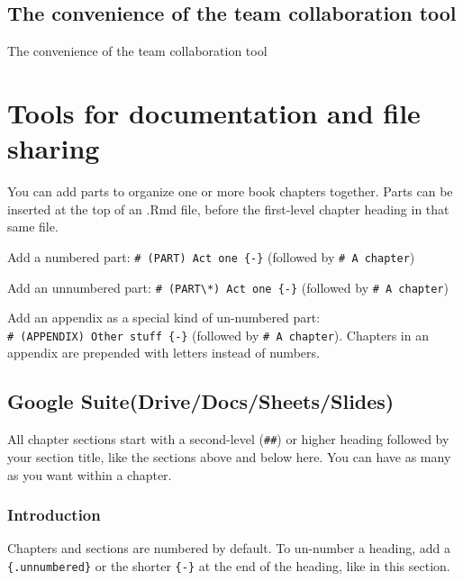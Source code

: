 \documentclass[
]{book}
\begin{document}
\hypertarget{the-convenience-of-the-team-collaboration-tool}{%
\section{The convenience of the team collaboration tool}\label{the-convenience-of-the-team-collaboration-tool}}

The convenience of the team collaboration tool

\hypertarget{tools-for-documentation-and-file-sharing}{%
\chapter{Tools for documentation and file sharing}\label{tools-for-documentation-and-file-sharing}}

You can add parts to organize one or more book chapters together. Parts can be inserted at the top of an .Rmd file, before the first-level chapter heading in that same file.

Add a numbered part: \texttt{\#\ (PART)\ Act\ one\ \{-\}} (followed by \texttt{\#\ A\ chapter})

Add an unnumbered part: \texttt{\#\ (PART\textbackslash{}*)\ Act\ one\ \{-\}} (followed by \texttt{\#\ A\ chapter})

Add an appendix as a special kind of un-numbered part: \texttt{\#\ (APPENDIX)\ Other\ stuff\ \{-\}} (followed by \texttt{\#\ A\ chapter}). Chapters in an appendix are prepended with letters instead of numbers.

\hypertarget{google-suitedrivedocssheetsslides}{%
\section{Google Suite(Drive/Docs/Sheets/Slides)}\label{google-suitedrivedocssheetsslides}}

All chapter sections start with a second-level (\texttt{\#\#}) or higher heading followed by your section title, like the sections above and below here. You can have as many as you want within a chapter.

\hypertarget{introduction-1}{%
\subsection{Introduction}\label{introduction-1}}

Chapters and sections are numbered by default. To un-number a heading, add a \texttt{\{.unnumbered\}} or the shorter \texttt{\{-\}} at the end of the heading, like in this section.
\end{document}
